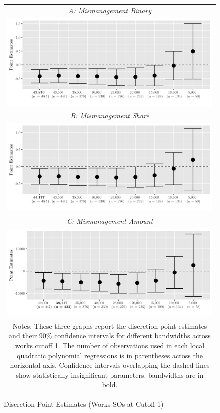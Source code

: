\documentclass[11pt]{article}
\begin{document}
\begin{figure}[!htbp]
  \caption{\label{fig:bandwidths} Discretion Point Estimates (Works SOs at Cutoff 1)}
  \centering
  \small
  \begin{tabular}{c}
  \emph{A: Mismanagement Binary} \\
  \includegraphics[scale = .14]{mismanagementplot1} \\
  \emph{B: Mismanagement Share} \\
  \includegraphics[scale = .14]{mismanagementplot2} \\
  \emph{C: Mismanagement Amount} \\
  \includegraphics[scale = .14]{mismanagementplot3} \\
  \multicolumn{1}{p{.67\textwidth}}{\scriptsize Notes: These three graphs report the discretion point estimates and their 90\% confidence intervals for different bandwidths across works cutoff 1. The number of observations used in each local quadratic polynomial regressions is in parentheses across the horizontal axis. Confidence intervals overlapping the dashed lines show statistically insignificant parameters. \citet{CalonicoOptimalDataDrivenRegression2015} bandwidths are in bold.}
  \end{tabular}
\end{figure}
\end{document}

